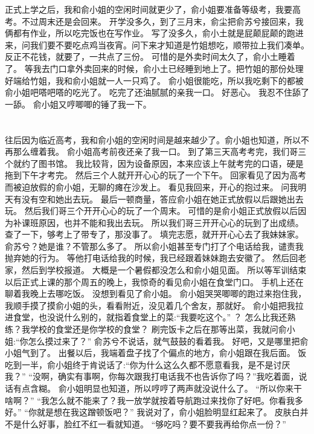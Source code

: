 正式上学之后，我和俞小姐的空闲时间就更少了，俞小姐要准备等级考，我要高考。不过周末还是会回来。
开学没多久，到了三月末，俞尘把俞苏兮接回来，我俩都有作业，所以吃完饭也在写作业。
写了没多久，俞小土就是屁颠屁颠的跑进来，问我们要不要吃点鸡当夜宵。问下来才知道是竹姐想吃，顺带拉上我们凑单。反正不花钱，就要了，一共点了三份。
可惜的是外卖时间太久了，俞小土睡着了。
等我去门口拿外卖回来的时候，俞小土已经睡到地上了。把竹姐的那份处理好端给竹姐，我和俞小姐就一人一只鸡了。
俞小姐很能吃，所以我吃剩下的都被俞小姐吧嗒吧嗒的吃光了。
吃完了还油腻腻的亲我一口。
好恶心。
我忍不住舔了一舔。
俞小姐又哼唧唧的锤了我一下。

\chapter{}
往后因为临近高考，我和俞小姐的空闲时间是越来越少了。俞小姐也知道，所以不再那么缠着我。
俞小姐高考前夜还亲了我一口。
到了第三天高考考完，我们哥三个就约了图书馆。
我比较背，因为设备原因，本来应该上午就考完的口语，硬是拖到下午才考完。
然后三个人就开开心心的玩了一个下午。
回家看见了因为高考而被迫放假的俞小姐，无聊的瘫在沙发上。
看见我回来，开心的抱过来。
问我明天有没有空和她出去玩。
最后一顿商量，答应俞小姐在她正式放假以后跟她出去玩。
然后我们哥三个开开心心的玩了一个周末。
可惜的是俞小姐正式放假以后因为补课班原因，也并不能和我出去玩。
所以我们哥三开开心心的玩到了出成绩。
查了一下，够考上了带专了，那没事了。
填完志愿，就开开心心去了我妹妹家。
俞苏兮？她是谁？不管那么多了。
所以俞小姐甚至专门打了个电话给我，谴责我抛弃她的行为。
等他打电话给我的时候，我已经跟着妹妹跑去安徽了。
然后回老家，然后到学校报道。
大概是一个暑假都没怎么和俞小姐见面。
所以等军训结束以后正式上课的那个周五的晚上，我惊奇的看见俞小姐在食堂门口。
手机上还在聊着我晚上去哪吃饭。
没想到看见了俞小姐。
俞小姐哭哭唧唧的跑过来抱住我，我顺手摸了摸俞小姐的头，看看附近，没见着几个舍友，那就好。
俞小姐把我拉进食堂，也没说什么别的，就指着食堂上的菜:“我要吃这个。”
？ 怎么比我还熟练？我学校的食堂还是你学校的食堂？
刷完饭卡之后在那等出菜，我就问俞小姐:“你怎么摸过来了？”
俞苏兮不说话，就气鼓鼓的看着我。
好吧，又是哪里把俞小姐气到了。
出餐以后，我端着盘子找了个偏点的地方，俞小姐跟在我后面。
饭吃到一半，俞小姐终于肯说话了:“你为什么这么久都不愿意看我，是不是讨厌我？”
“没啊，确实有事啊，你每次跟我打电话我不也告诉你了吗？”我吃着面，说话有点含糊。
俞小姐明显也知道，所以哼哼了两声就没说什么了。
“所以你来干啥啊？”
“我怎么就不能来了？我一放学就按着导航跑过来找你了好吧。你看我多好。”
“你就是想在我这蹭顿饭吧？”
我说对了，俞小姐脸明显红起来了。
皮肤白并不是什么好事，脸红不红一看就知道。
“够吃吗？要不要我再给你点一份？”
